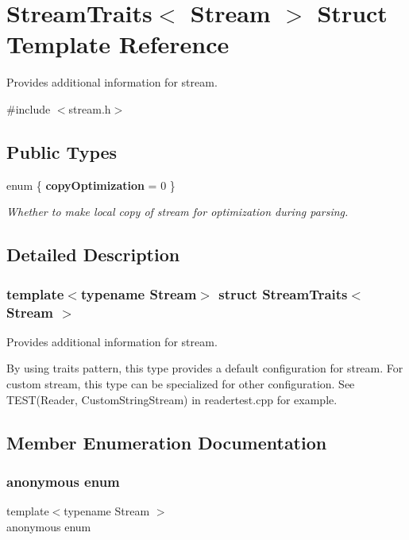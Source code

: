 \hypertarget{a02416}{}\section{Stream\+Traits$<$ Stream $>$ Struct Template Reference}
\label{a02416}


Provides additional information for stream.  




{\ttfamily \#include $<$stream.\+h$>$}

\subsection*{Public Types}
\begin{DoxyCompactItemize}
\item 
enum \{ {\bfseries copy\+Optimization} = 0
 \}\begin{DoxyCompactList}\small\item\em Whether to make local copy of stream for optimization during parsing. \end{DoxyCompactList}
\end{DoxyCompactItemize}


\subsection{Detailed Description}
\subsubsection*{template$<$typename Stream$>$\newline
struct Stream\+Traits$<$ Stream $>$}

Provides additional information for stream. 

By using traits pattern, this type provides a default configuration for stream. For custom stream, this type can be specialized for other configuration. See T\+E\+S\+T(\+Reader, Custom\+String\+Stream) in readertest.\+cpp for example. 

\subsection{Member Enumeration Documentation}
\mbox{\label{a02416_a817c100072225c8cf4f6570bb8be4364}} 
\subsubsection{\texorpdfstring{anonymous enum}{anonymous enum}}
{\footnotesize\ttfamily template$<$typename Stream $>$ \\
anonymous enum}



